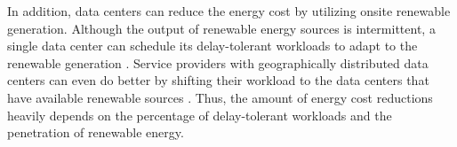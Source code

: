 In addition, data centers can reduce the energy cost by utilizing onsite renewable generation. Although the output of renewable energy sources is intermittent, a single data center can schedule its delay-tolerant workloads to adapt to the renewable generation \cite{liu2012renewable}. Service providers with geographically distributed data centers can even do better by shifting their workload to the data centers that have available renewable sources \cite{chen2012green, liu2011greening,gupta2016cool}. Thus, the amount of energy cost reductions heavily depends on the percentage of delay-tolerant workloads and the penetration of renewable energy. 


